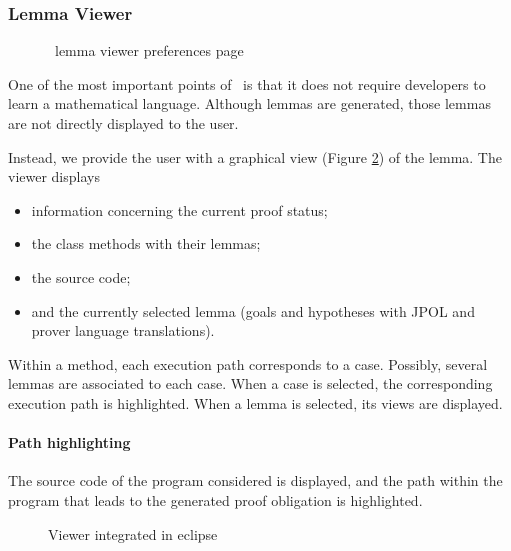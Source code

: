 \subsubsection{Lemma Viewer}
\begin{figure}[p]
 \caption{\JACK\ lemma viewer preferences page}
 \label{JACKlemviewprefpage}
\end{figure}
\label{Viewer}
One of the most important points of \JACK\ is that it does not require
developers to learn a mathematical language.  Although lemmas are
generated, those lemmas are not directly displayed to the user.

Instead, we provide the user with a graphical view (Figure \ref{Viewer image}) of the lemma.
 The viewer displays
 \begin{itemize}
  \item information concerning the current proof status;
  \item the class methods with their lemmas;
  \item the source code;
  \item and the currently selected lemma (goals and hypotheses with JPOL and prover language translations).
\end{itemize}
 Within a method, each execution path corresponds to a case.
 Possibly, several lemmas are associated to each case.
 When a case is selected, the corresponding execution path is highlighted.
 When a lemma is selected, its views are displayed.
\paragraph{Path highlighting}
The source code of the program considered is displayed, and the
path within the program that leads to the generated proof obligation
is highlighted.

\begin{figure}[p]
 \caption{Viewer integrated in eclipse}
 \label{Viewer image}
\end{figure}

